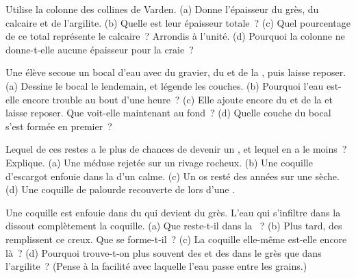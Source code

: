 \begin{exercise}[$\star\star$]\label{exo:g7:sediments-and-fossils:5}
Utilise la colonne des collines de Varden. (a) Donne l'épaisseur du grès,
du calcaire et de l'argilite. (b) Quelle est leur épaisseur totale~? (c)
Quel pourcentage de ce total représente le calcaire~? Arrondis à l'unité.
(d) Pourquoi la colonne ne donne-t-elle aucune épaisseur pour la craie~?
\end{exercise}

\begin{exercise}[$\star\star$]\label{exo:g7:sediments-and-fossils:6}
Une élève secoue un bocal d'eau avec du gravier, du  et de la ,
puis laisse reposer. (a) Dessine le bocal le lendemain, et légende les
couches. (b) Pourquoi l'eau est-elle encore trouble au bout d'une
heure~? (c) Elle ajoute encore du  et de la  et laisse reposer.
Que voit-elle maintenant au fond~? (d) Quelle couche du bocal s'est formée
en premier~?
\end{exercise}

\begin{exercise}[$\star\star$]\label{exo:g7:sediments-and-fossils:7}
Lequel de ces restes a le plus de chances de devenir un , et lequel
en a le moins~? Explique. (a) Une méduse rejetée sur un rivage rocheux.
(b) Une coquille d'escargot enfouie dans la  d'un  calme. (c) Un os
resté des années sur une  sèche. (d) Une coquille de palourde
recouverte de  lors d'une .
\end{exercise}

\begin{exercise}[$\star\star$]\label{exo:g7:sediments-and-fossils:8}
Une coquille est enfouie dans du  qui devient du grès. L'eau qui
s'infiltre dans la  dissout complètement la coquille. (a) Que
reste-t-il dans la ~? (b) Plus tard, des  remplissent ce
creux. Que se forme-t-il~? (c) La coquille elle-même est-elle encore
là~? (d) Pourquoi trouve-t-on plus souvent des  et des 
dans le grès que dans l'argilite~? (Pense à la facilité avec laquelle
l'eau passe entre les grains.)
\end{exercise}

